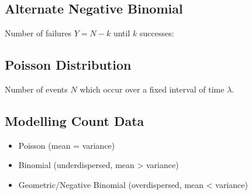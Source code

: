 \documentclass{article}
\begin{document}
\begin{minipage}{62.39259259mm}
    \subsection{Alternate Negative Binomial}
    Number of failures \(Y = N - k\) until \(k\) successes:
    \subsection{Poisson Distribution}
    Number of events \(N\) which occur over a fixed interval of time \(\lambda\).
    \subsection{Modelling Count Data}
    \begin{itemize}
        \setlength\itemsep{-0.2em}
        \item Poisson (mean = variance)
        \item Binomial (underdispersed, mean > variance)
        \item Geometric/Negative Binomial \newline (overdispersed, mean < variance)
    \end{itemize}
\end{minipage}
\end{document}
